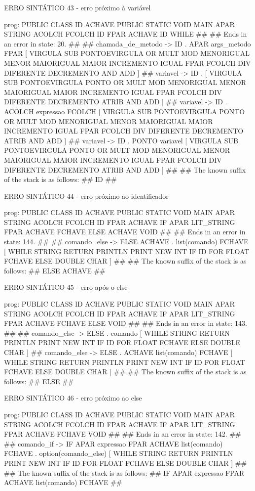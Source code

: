 \documentclass[12pt,a4paper,twoside]{report}
\begin{document}
\begin{terminal}
ERRO SINTÁTICO 43 - erro próximo à variável

prog: PUBLIC CLASS ID ACHAVE PUBLIC STATIC VOID MAIN APAR STRING ACOLCH FCOLCH ID FPAR ACHAVE ID WHILE 
##
## Ends in an error in state: 20.
##
## chamada_de_metodo -> ID . APAR args_metodo FPAR [ VIRGULA SUB PONTOEVIRGULA OR MULT MOD MENORIGUAL MENOR MAIORIGUAL MAIOR INCREMENTO IGUAL FPAR FCOLCH DIV DIFERENTE DECREMENTO AND ADD ]
## variavel -> ID . [ VIRGULA SUB PONTOEVIRGULA PONTO OR MULT MOD MENORIGUAL MENOR MAIORIGUAL MAIOR INCREMENTO IGUAL FPAR FCOLCH DIV DIFERENTE DECREMENTO ATRIB AND ADD ]
## variavel -> ID . ACOLCH expressao FCOLCH [ VIRGULA SUB PONTOEVIRGULA PONTO OR MULT MOD MENORIGUAL MENOR MAIORIGUAL MAIOR INCREMENTO IGUAL FPAR FCOLCH DIV DIFERENTE DECREMENTO ATRIB AND ADD ]
## variavel -> ID . PONTO variavel [ VIRGULA SUB PONTOEVIRGULA PONTO OR MULT MOD MENORIGUAL MENOR MAIORIGUAL MAIOR INCREMENTO IGUAL FPAR FCOLCH DIV DIFERENTE DECREMENTO ATRIB AND ADD ]
##
## The known suffix of the stack is as follows:
## ID 
##

ERRO SINTÁTICO 44 - erro próximo ao identificador

prog: PUBLIC CLASS ID ACHAVE PUBLIC STATIC VOID MAIN APAR STRING ACOLCH FCOLCH ID FPAR ACHAVE IF APAR LIT_STRING FPAR ACHAVE FCHAVE ELSE ACHAVE VOID 
##
## Ends in an error in state: 144.
##
## comando_else -> ELSE ACHAVE . list(comando) FCHAVE [ WHILE STRING RETURN PRINTLN PRINT NEW INT IF ID FOR FLOAT FCHAVE ELSE DOUBLE CHAR ]
##
## The known suffix of the stack is as follows:
## ELSE ACHAVE 
##

ERRO SINTÁTICO 45 - erro após o else{

prog: PUBLIC CLASS ID ACHAVE PUBLIC STATIC VOID MAIN APAR STRING ACOLCH FCOLCH ID FPAR ACHAVE IF APAR LIT_STRING FPAR ACHAVE FCHAVE ELSE VOID 
##
## Ends in an error in state: 143.
##
## comando_else -> ELSE . comando [ WHILE STRING RETURN PRINTLN PRINT NEW INT IF ID FOR FLOAT FCHAVE ELSE DOUBLE CHAR ]
## comando_else -> ELSE . ACHAVE list(comando) FCHAVE [ WHILE STRING RETURN PRINTLN PRINT NEW INT IF ID FOR FLOAT FCHAVE ELSE DOUBLE CHAR ]
##
## The known suffix of the stack is as follows:
## ELSE 
##

ERRO SINTÁTICO 46 - erro próximo ao else

prog: PUBLIC CLASS ID ACHAVE PUBLIC STATIC VOID MAIN APAR STRING ACOLCH FCOLCH ID FPAR ACHAVE IF APAR LIT_STRING FPAR ACHAVE FCHAVE VOID 
##
## Ends in an error in state: 142.
##
## comando_if -> IF APAR expressao FPAR ACHAVE list(comando) FCHAVE . option(comando_else) [ WHILE STRING RETURN PRINTLN PRINT NEW INT IF ID FOR FLOAT FCHAVE ELSE DOUBLE CHAR ]
##
## The known suffix of the stack is as follows:
## IF APAR expressao FPAR ACHAVE list(comando) FCHAVE 
##

}
\end{terminal}
\end{document}
